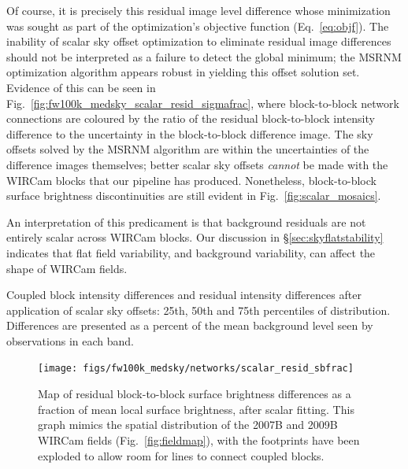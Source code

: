 \documentclass[iop]{emulateapj}
\newcommand{\Fig}[1]{Fig.~\ref{fig:#1}}  %
\newcommand{\Eq}[1]{Eq.~\ref{eq:#1}}  %
\newcommand{\Sec}[1]{\S\ref{sec:#1}}  %
\begin{document}
Of course, it is precisely this residual image level difference whose minimization was sought as part of the optimization's objective function (\Eq{objf}).
The inability of scalar sky offset optimization to eliminate residual image differences should not be interpreted as a failure to detect the global minimum; the MSRNM optimization algorithm appears robust in yielding this offset solution set.
Evidence of this can be seen in \Fig{fw100k_medsky_scalar_resid_sigmafrac}, where block-to-block network connections are coloured by the ratio of the residual block-to-block intensity difference to the uncertainty in the block-to-block difference image.
The sky offsets solved by the MSRNM algorithm are within the uncertainties of the difference images themselves; better scalar sky offsets \emph{cannot} be made with the WIRCam blocks that our pipeline has produced.
Nonetheless, block-to-block surface brightness discontinuities are still evident in \Fig{scalar_mosaics}.

An interpretation of this predicament is that background residuals are not entirely scalar across WIRCam blocks.
Our discussion in \Sec{skyflatstability} indicates that flat field variability, and background variability, can affect the shape of WIRCam fields.

\begin{table}[t]
\centering
\caption[Coupled block differences and residual differences after
scalar sky offsets]{Coupled block intensity differences and residual intensity differences after application of scalar sky offsets: 25th, 50th and 75th percentiles of distribution.
Differences are presented as a percent of the mean background level seen by observations in each band.
}

\label{tab:fw100k_medsky_scalar_resid_diffs}
\end{table}

\begin{figure}[t]
\centering
\texttt{[image: figs/fw100k\_medsky/networks/scalar\_resid\_sbfrac]}
\caption{Map of residual block-to-block surface brightness differences as a fraction of mean local surface brightness, after scalar fitting.
  This graph mimics the spatial distribution of the 2007B and 2009B WIRCam fields (\Fig{fieldmap}), with the footprints have been exploded to allow room for lines to connect coupled blocks.
}
\label{fig:fw100k_medsky_scalar_resid_sbfrac}
\end{figure}
\end{document}
